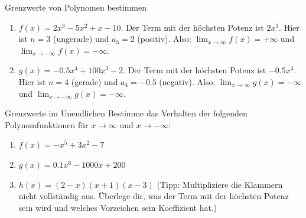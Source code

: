\begin{beispielumgebung}{Grenzwerte von Polynomen bestimmen}
\begin{enumerate}
    \item $f(x) = 2x^3 - 5x^2 + x - 10$.
    Der Term mit der höchsten Potenz ist $2x^3$. Hier ist $n=3$ (ungerade) und $a_3=2$ (positiv).
    Also: $\lim_{x \to \infty} f(x) = +\infty$ und $\lim_{x \to -\infty} f(x) = -\infty$.

    \item $g(x) = -0.5x^4 + 100x^3 - 2$.
    Der Term mit der höchsten Potenz ist $-0.5x^4$. Hier ist $n=4$ (gerade) und $a_4=-0.5$ (negativ).
    Also: $\lim_{x \to \infty} g(x) = -\infty$ und $\lim_{x \to -\infty} g(x) = -\infty$.
\end{enumerate}
\end{beispielumgebung}

\begin{aufgabenumgebung}{Grenzwerte im Unendlichen}
Bestimme das Verhalten der folgenden Polynomfunktionen für $x \to \infty$ und $x \to -\infty$:
\begin{enumerate}
    \item $f(x) = -x^5 + 3x^2 - 7$
    \item $g(x) = 0.1x^6 - 1000x + 200$
    \item $h(x) = (2-x)(x+1)(x-3)$ (Tipp: Multipliziere die Klammern nicht vollständig aus. Überlege dir, was der Term mit der höchsten Potenz sein wird und welches Vorzeichen sein Koeffizient hat.)
\end{enumerate}
\end{aufgabenumgebung}

